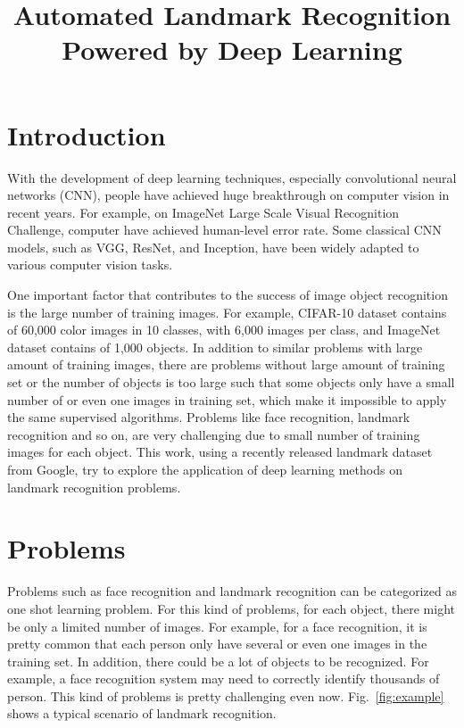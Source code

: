 \documentclass{article}
\title{Automated Landmark Recognition Powered by Deep Learning}
\begin{document}
%
\maketitle

\section{Introduction}
\label{sec:intro}
With the development of deep learning techniques, especially convolutional neural networks (CNN), people have achieved huge breakthrough on computer vision in recent years. For example, on ImageNet Large Scale Visual Recognition Challenge, computer have achieved human-level error rate. Some classical CNN models, such as VGG, ResNet, and Inception, have been widely adapted to various computer vision tasks. 

One important factor that contributes to the success of image object recognition is the large number of training images. For example, CIFAR-10 dataset contains of 60,000 color images in 10 classes, with 6,000 images per class, and ImageNet dataset contains of 1,000 objects. In addition to similar problems with large amount of training images, there are problems without large amount of training set or the number of objects is too large such that some objects only have a small number of or even one images in training set, which make it impossible to apply the same supervised algorithms. Problems like face recognition, landmark recognition and so on, are very challenging due to small number of training images for each object. This work, using a recently released landmark dataset from Google, try to explore the application of deep learning methods on landmark recognition problems.

\section{Problems}
\label{sec:problem}
Problems such as face recognition and landmark recognition can be categorized as one shot learning problem. For this kind of problems, for each object, there might be only a limited number of images. For example, for a face recognition, it is pretty common that each person only have several or even one images in the training set. In addition, there could be a lot of objects to be recognized. For example, a face recognition system may need to correctly identify thousands of person. This kind of problems is pretty challenging even now. Fig.~\ref{fig:example} shows a typical scenario of landmark recognition.
\end{document}
